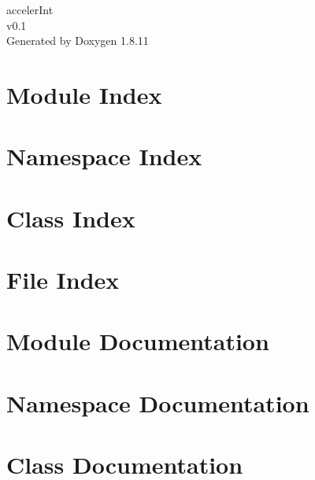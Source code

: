 \documentclass[twoside]{book}
\newcommand{\+}{\discretionary{\mbox{\scriptsize$\hookleftarrow$}}{}{}}
\newcommand{\clearemptydoublepage}{%
  \newpage{\pagestyle{empty}\cleardoublepage}%
}
\begin{document}
\hypersetup{pageanchor=false,
             bookmarksnumbered=true,
             pdfencoding=unicode
            }
\begin{titlepage}
\vspace*{7cm}
\begin{center}%
{\Large acceler\+Int \\[1ex]\large v0.\+1 }\\
\vspace*{1cm}
{\large Generated by Doxygen 1.8.11}\\
\end{center}
\end{titlepage}
\clearemptydoublepage
\tableofcontents
\clearemptydoublepage
{}
\hypersetup{pageanchor=true}

\chapter{Module Index}

\chapter{Namespace Index}

\chapter{Class Index}

\chapter{File Index}

\chapter{Module Documentation}









\chapter{Namespace Documentation}










\chapter{Class Documentation}





\end{document}
